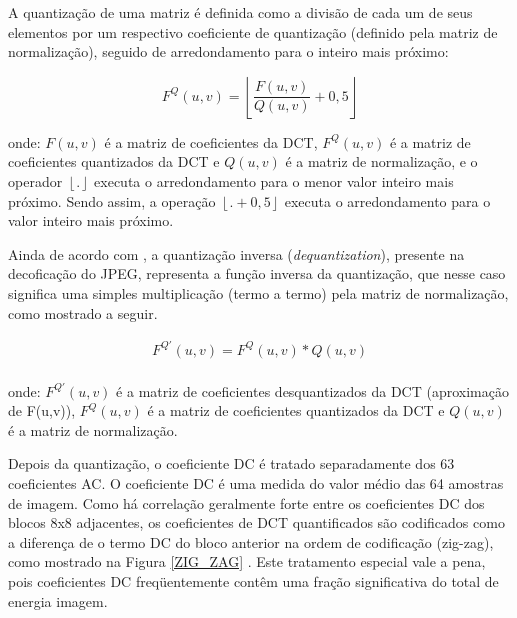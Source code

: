 A quantização de uma matriz é definida como a divisão de cada um de seus elementos por um respectivo coeficiente de quantização (definido pela matriz de normalização), seguido de arredondamento para o inteiro mais próximo:
\vspace{-3mm}
\begin{flushleft}
	\begin{equation}
		F^Q(u,v)=\left \lfloor \frac{F(u,v)}{Q(u,v)} +0,5 \right \rfloor
	\end{equation}
\end{flushleft}
onde:
			$F(u,v)$ é a matriz de coeficientes da DCT,
			$F^Q(u,v)$ é a matriz de coeficientes quantizados da DCT e
			$Q(u,v)$ é a matriz de normalização,
			e o operador $\left \lfloor . \right \rfloor$ executa o arredondamento para o menor valor inteiro mais próximo. Sendo assim, a operação $\left \lfloor . +0,5 \right \rfloor$ executa o arredondamento para o valor inteiro mais próximo.

			

Ainda de acordo com \cite{wallace1991jpeg}, a quantização inversa (\textit{dequantization}), presente na decoficação do JPEG, representa a função inversa da quantização, que nesse caso significa uma simples multiplicação (termo a termo) pela matriz de normalização, como mostrado a seguir.
\vspace{-5mm}
\begin{center}
	\begin{equation}
		\begin{split}
			F^{Q'}(u,v) =F^Q(u,v) * Q(u,v) \\
		\end{split}
	\end{equation}
\end{center} 
onde:
			$F^{Q'}(u,v)$ é a matriz de coeficientes desquantizados da DCT (aproximação de F(u,v)), 
			$F^Q(u,v)$ é a matriz de coeficientes quantizados da DCT e
			$Q(u,v)$ é a matriz de normalização.

Depois da quantização, o coeficiente DC é tratado separadamente dos 63 coeficientes AC. O coeficiente DC é uma medida do valor médio das 64 amostras de imagem. Como há correlação geralmente forte entre os coeficientes DC dos blocos 8x8 adjacentes, os coeficientes de DCT quantificados são codificados como a diferença de o termo DC do bloco anterior na ordem de codificação (zig-zag), como mostrado na Figura \ref{ZIG_ZAG} . Este tratamento especial vale a pena, pois coeficientes DC freqüentemente contêm uma fração significativa do total de energia imagem. \cite{wallace1991jpeg}

